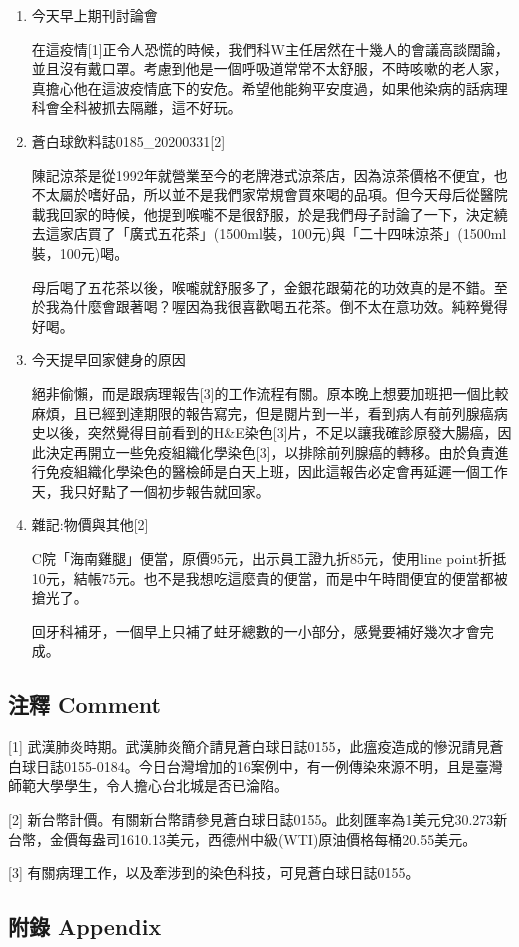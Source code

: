 \documentclass[
]{article}
\begin{document}
\begin{enumerate}
\def\labelenumi{\arabic{enumi}.}
\item
  今天早上期刊討論會

  在這疫情{[}1{]}正令人恐慌的時候，我們科W主任居然在十幾人的會議高談闊論，並且沒有戴口罩。考慮到他是一個呼吸道常常不太舒服，不時咳嗽的老人家，真擔心他在這波疫情底下的安危。希望他能夠平安度過，如果他染病的話病理科會全科被抓去隔離，這不好玩。
\item
  蒼白球飲料誌0185\_20200331{[}2{]}

  陳記涼茶是從1992年就營業至今的老牌港式涼茶店，因為涼茶價格不便宜，也不太屬於嗜好品，所以並不是我們家常規會買來喝的品項。但今天母后從醫院載我回家的時候，他提到喉嚨不是很舒服，於是我們母子討論了一下，決定繞去這家店買了「廣式五花茶」(1500ml裝，100元)與「二十四味涼茶」(1500ml裝，100元)喝。

  母后喝了五花茶以後，喉嚨就舒服多了，金銀花跟菊花的功效真的是不錯。至於我為什麼會跟著喝？喔因為我很喜歡喝五花茶。倒不太在意功效。純粹覺得好喝。
\item
  今天提早回家健身的原因

  絕非偷懶，而是跟病理報告{[}3{]}的工作流程有關。原本晚上想要加班把一個比較麻煩，且已經到達期限的報告寫完，但是閱片到一半，看到病人有前列腺癌病史以後，突然覺得目前看到的H\&E染色{[}3{]}片，不足以讓我確診原發大腸癌，因此決定再開立一些免疫組織化學染色{[}3{]}，以排除前列腺癌的轉移。由於負責進行免疫組織化學染色的醫檢師是白天上班，因此這報告必定會再延遲一個工作天，我只好點了一個初步報告就回家。
\item
  雜記:物價與其他{[}2{]}

  C院「海南雞腿」便當，原價95元，出示員工證九折85元，使用line
  point折抵10元，結帳75元。也不是我想吃這麼貴的便當，而是中午時間便宜的便當都被搶光了。

  回牙科補牙，一個早上只補了蛀牙總數的一小部分，感覺要補好幾次才會完成。
\end{enumerate}

\hypertarget{ux6ce8ux91cb-comment-30}{%
\subsection{注釋 Comment}\label{ux6ce8ux91cb-comment-30}}

{[}1{]}
武漢肺炎時期。武漢肺炎簡介請見蒼白球日誌0155，此瘟疫造成的慘況請見蒼白球日誌0155-0184。今日台灣增加的16案例中，有一例傳染來源不明，且是臺灣師範大學學生，令人擔心台北城是否已淪陷。

{[}2{]}
新台幣計價。有關新台幣請參見蒼白球日誌0155。此刻匯率為1美元兌30.273新台幣，金價每盎司1610.13美元，西德州中級(WTI)原油價格每桶20.55美元。

{[}3{]} 有關病理工作，以及牽涉到的染色科技，可見蒼白球日誌0155。

\hypertarget{ux9644ux9304-appendix-30}{%
\subsection{附錄 Appendix}\label{ux9644ux9304-appendix-30}}
\end{document}
